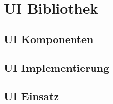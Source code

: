 \section{UI Bibliothek}

\subsection{UI Komponenten}

\subsection{UI Implementierung}

\subsection{UI Einsatz}